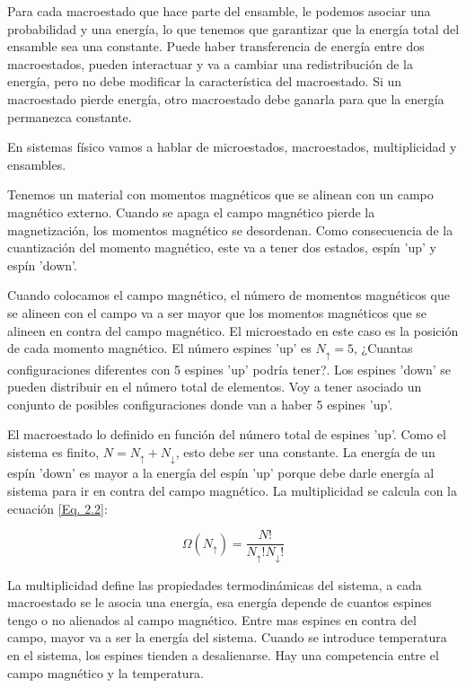 \documentclass[11pt,fleqn]{book}
\begin{document}
Para cada macroestado que hace parte del ensamble, le podemos asociar una probabilidad y una energía, lo que tenemos que garantizar que la energía total del ensamble sea una constante. Puede haber transferencia de energía entre dos macroestados, pueden interactuar y va a cambiar una redistribución de la energía, pero no debe modificar la característica del macroestado. Si un macroestado pierde energía, otro macroestado debe ganarla para que la energía permanezca constante.

En sistemas físico vamos a hablar de microestados, macroestados, multiplicidad y ensambles.

\begin{example}

Tenemos un material con momentos magnéticos que se alinean con un campo magnético externo. Cuando se apaga el campo magnético pierde la magnetización, los momentos magnético se desordenan. Como consecuencia de la cuantización del momento magnético, este va a tener dos estados, espín 'up' y espín 'down'. 


Cuando colocamos el campo magnético, el número de momentos magnéticos que se alineen con el campo va a ser mayor que los momentos magnéticos que se alineen en contra del campo magnético. El microestado en este caso es la posición de cada momento magnético. El número espines 'up' es $N_{\uparrow}=5$, ¿Cuantas configuraciones diferentes con 5 espines 'up' podría tener?. Los espines 'down' se pueden distribuir en el número total de elementos. Voy a tener asociado un conjunto de posibles configuraciones donde van a haber 5 espines 'up'.


El macroestado lo definido en función del número total de espines 'up'. Como el sistema es finito, $N=N_{\uparrow}+N_{\downarrow}$, esto debe ser una constante. La energía de un espín 'down' es mayor a la energía del espín 'up' porque debe darle energía al sistema para ir en contra del campo magnético. La multiplicidad se calcula con la ecuación \ref{Eq. 2.2}:

\begin{equation*}
    \Omega(N_{\uparrow})=\frac{N!}{N_{\uparrow}!N_{\downarrow}!}
\end{equation*}

La multiplicidad define las propiedades termodinámicas del sistema, a cada macroestado se le asocia una energía, esa energía depende de cuantos espines tengo o no alienados al campo magnético. Entre mas espines en contra del campo, mayor va a ser la energía del sistema. Cuando se introduce temperatura en el sistema, los espines tienden a desalienarse. Hay una competencia entre el campo magnético y la temperatura. 


\end{example}
\end{document}
